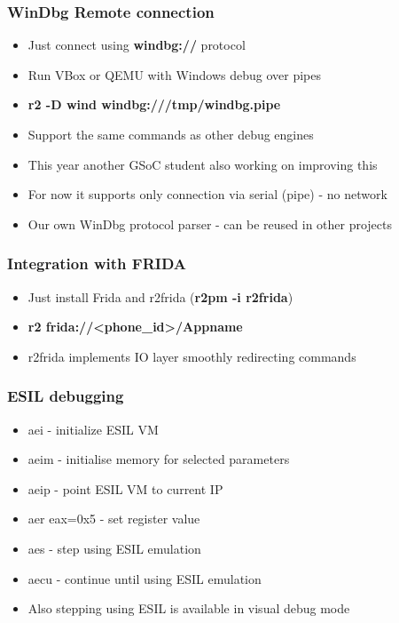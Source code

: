 \documentclass[10pt,pdf,utf8,english,compress,hyperref={unicode}]{beamer}
\begin{document}
\begin{frame}[fragile]
\frametitle{WinDbg Remote connection}
\begin{itemize}
	\item Just connect using \textbf{windbg://} protocol
	\item Run VBox or QEMU with Windows debug over pipes
	\item \textbf{r2 -D wind windbg:///tmp/windbg.pipe}
	\item Support the same commands as other debug engines
	\item This year another GSoC student also working on improving
	this
	\item For now it supports only connection via serial (pipe) - no network
	\item Our own WinDbg protocol parser - can be reused in other projects
\end{itemize}
\end{frame}

\begin{frame}[fragile]
\frametitle{Integration with FRIDA}
\begin{itemize}
	\item Just install Frida and r2frida (\textbf{r2pm -i r2frida})
	\item \textbf{r2 frida://<phone\_id>/Appname}
	\item r2frida implements IO layer smoothly redirecting commands
\end{itemize}
\end{frame}

\begin{frame}[fragile]
  \frametitle{ESIL debugging}
  \begin{itemize}
	  \item \alert{aei} - initialize ESIL VM
	  \item \alert{aeim} - initialise memory for selected parameters
	  \item \alert{aeip} - point ESIL VM to current IP
	  \item \alert{aer eax=0x5} - set register value
	  \item \alert{aes} - step using ESIL emulation
	  \item \alert{aecu} - continue until using ESIL emulation
	  \item Also stepping using ESIL is available in visual debug mode
  \end{itemize}
\end{frame}
\end{document}
